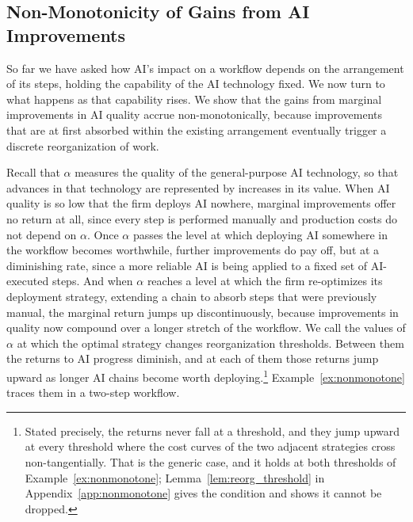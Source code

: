 \subsection{Non-Monotonicity of Gains from AI Improvements}
\label{sec:nonlinear}

So far we have asked how AI's impact on a workflow depends on the arrangement of its steps, holding the capability of the AI technology fixed.
We now turn to what happens as that capability rises.
We show that the gains from marginal improvements in AI quality accrue non-monotonically, because improvements that are at first absorbed within the existing arrangement eventually trigger a discrete reorganization of work.

Recall that $\alpha$ measures the quality of the general-purpose AI technology, so that advances in that technology are represented by increases in its value.
When AI quality is so low that the firm deploys AI nowhere, marginal improvements offer no return at all, since every step is performed manually and production costs do not depend on $\alpha$.
Once $\alpha$ passes the level at which deploying AI somewhere in the workflow becomes worthwhile, further improvements do pay off, but at a diminishing rate, since a more reliable AI is being applied to a fixed set of AI-executed steps.
And when $\alpha$ reaches a level at which the firm re-optimizes its deployment strategy, extending a chain to absorb steps that were previously manual, the marginal return jumps up discontinuously, because improvements in quality now compound over a longer stretch of the workflow.
We call the values of $\alpha$ at which the optimal strategy changes reorganization thresholds. Between them the returns to AI progress diminish, and at each of them those returns jump upward as longer AI chains become worth deploying.\footnote{Stated precisely, the returns never fall at a threshold, and they jump upward at every threshold where the cost curves of the two adjacent strategies cross non-tangentially. That is the generic case, and it holds at both thresholds of Example~\ref{ex:nonmonotone}; Lemma~\ref{lem:reorg_threshold} in Appendix~\ref{app:nonmonotone} gives the condition and shows it cannot be dropped.}
Example~\ref{ex:nonmonotone} traces them in a two-step workflow.

